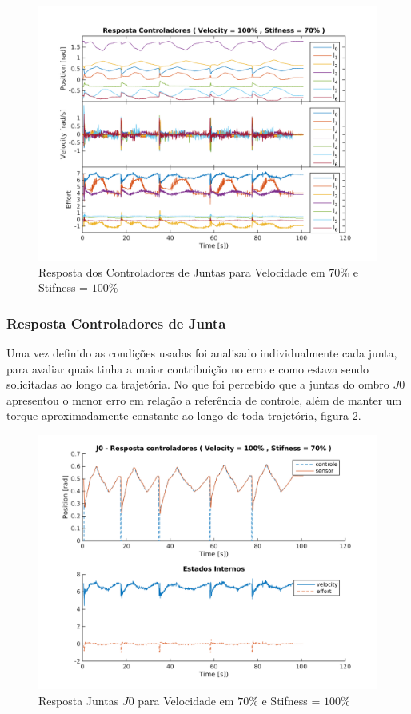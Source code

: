 \begin{figure}[H]
    \centering
    \includegraphics[width=0.8\linewidth,trim={2cm 1cm 2cm 2cm}]{tex/figs/squareStifff9stateEvalv100s70.png}
    \caption{Resposta dos Controladores de Juntas para Velocidade em $70\%$ e Stifness = $100\%$ }
    \label{fig:squareStifff9stateEvalv100s70}
\end{figure}

\subsubsection{Resposta Controladores de Junta}

Uma vez definido as condições usadas foi analisado individualmente cada junta, para avaliar quais tinha a maior contribuição no erro e como estava sendo solicitadas ao longo da trajetória. No que foi percebido que a juntas do ombro $J0$ apresentou o menor erro em relação a referência de controle, além de manter um torque aproximadamente constante ao longo de toda trajetória, figura \ref{fig:squareStiffJ9stateEval_J0v100s70}.

\vspace{1cm}

\begin{figure}[H]
    \centering
    \includegraphics[width=0.6\linewidth,trim={2cm 1cm 2cm 2cm}]{tex/figs/squareStiffJ9stateEval_J0v100s70.png}
    \caption{Resposta Juntas $J0$ para Velocidade em $70\%$ e Stifness = $100\%$ }
    \label{fig:squareStiffJ9stateEval_J0v100s70}
\end{figure}

